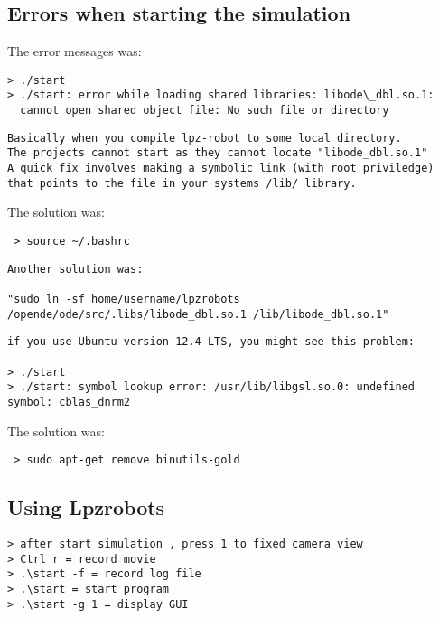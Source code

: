 \subsection{Errors when starting the simulation}

The error messages was:

\begin{lstlisting}
> ./start
> ./start: error while loading shared libraries: libode\_dbl.so.1:
  cannot open shared object file: No such file or directory
\end{lstlisting}

\begin{lstlisting}
Basically when you compile lpz-robot to some local directory.
The projects cannot start as they cannot locate "libode_dbl.so.1"
A quick fix involves making a symbolic link (with root priviledge)
that points to the file in your systems /lib/ library.
\end{lstlisting}

The solution was:
\begin{lstlisting}
 > source ~/.bashrc
\end{lstlisting}

\begin{lstlisting}
Another solution was:

"sudo ln -sf home/username/lpzrobots
/opende/ode/src/.libs/libode_dbl.so.1 /lib/libode_dbl.so.1"
\end{lstlisting}


\begin{lstlisting}
if you use Ubuntu version 12.4 LTS, you might see this problem:

> ./start
> ./start: symbol lookup error: /usr/lib/libgsl.so.0: undefined symbol: cblas_dnrm2
\end{lstlisting}
The solution was:
\begin{lstlisting}
 > sudo apt-get remove binutils-gold
\end{lstlisting}



\subsection{Using Lpzrobots}
\begin{lstlisting}
> after start simulation , press 1 to fixed camera view
> Ctrl r = record movie
> .\start -f = record log file
> .\start = start program
> .\start -g 1 = display GUI
\end{lstlisting}

